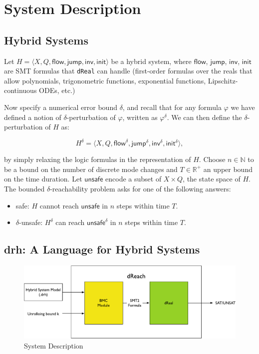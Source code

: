 \section{System Description}
\subsection{Hybrid Systems}

Let $H = \langle X, Q, \mathsf{flow}, \mathsf{jump},
\mathsf{inv},\mathsf{init}\rangle$ be a hybrid system, where
$\mathsf{flow}$, $\mathsf{jump}$, $\mathsf{inv}$, $\mathsf{init}$ are
SMT formulas that \texttt{dReal} can handle (first-order formulas over
the reals that allow polynomials, trigonometric functions, exponential
functions, Lipschitz-continuous ODEs, etc.)

Now specify a numerical error bound $\delta$, and recall that for any
formula $\varphi$ we have defined a notion of $\delta$-perturbation of
$\varphi$, written as $\varphi^{\delta}$. We can then define the
$\delta$-perturbation of $H$ as:

\[
H^{\delta} = \langle X, Q, {\mathsf{flow}}^{\delta},
{\mathsf{jump}}^{\delta}, {\mathsf{inv}}^{\delta},
{\mathsf{init}}^{\delta}\rangle,
\]

by simply relaxing the logic formulas in the representation of $H$.
Choose $n\in\mathbb{N}$ to be a bound on the number of discrete mode
changes and $T\in \mathbb{R}^+$ an upper bound on the time duration.
Let $\mathsf{unsafe}$ encode a subset of $X\times Q$, the state space
of $H$. The bounded $\delta$-reachability problem asks for one of the
following answers:

\begin{itemize}
\item  safe: $H$ cannot reach $\mathsf{unsafe}$ in $n$ steps within
  time $T$.
\item $\delta$-unsafe: $H^{\delta}$ can reach ${\mathsf{unsafe}}^{\delta}$ in $n$ steps within time $T$.
\end{itemize}

\subsection{drh: A Language for Hybrid Systems}
\begin{figure}
  \centering
  \includegraphics[width=\textwidth]{images/dReach}
  \caption{System Description}
  \label{fig:system-description}
\end{figure}

